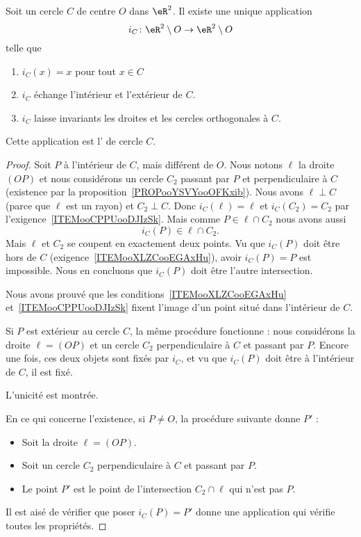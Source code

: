\begin{propositionDef}       \label{PROPDEFooVLIWooQgpLQa}
	Soit un cercle \( C\) de centre \( O\) dans \( \eR^2\). Il existe une unique application
	\begin{equation}
		i_C\colon \eR^2\setminus O\to \eR^2\setminus O
	\end{equation}
	telle que
	\begin{enumerate}
		\item
		      \( i_C(x)=x\) pour tout \( x\in C\)
		\item\label{ITEMooXLZCooEGAxHu}
		      \( i_C\) échange l'intérieur et l'extérieur de \( C\).
		\item\label{ITEMooCPPUooDJIzSk}
		      \( i_C\) laisse invariants les droites et les cercles orthogonales à \( C\).
	\end{enumerate}
	Cette application est l' de cercle \( C\).
\end{propositionDef}

\begin{proof}
	Soit \( P\) à l'intérieur de \( C\), mais différent de \( O\). Nous notons \( \ell\) la droite \( (OP)\) et nous considérons un cercle \( C_2\) passant par \( P\) et perpendiculaire à \( C\) (existence par la proposition~\ref{PROPooYSVYooOFKxib}). Nous avons \( \ell\perp C\) (parce que \( \ell\) est un rayon) et \( C_2\perp C\). Donc \( i_C(\ell)=\ell\) et \( i_C(C_2)=C_2\) par l'exigence~\ref{ITEMooCPPUooDJIzSk}. Mais comme \( P\in\ell\cap C_2 \) nous avons aussi
	\begin{equation}
		i_C(P)\in \ell\cap C_2.
	\end{equation}
	Mais \( \ell\) et \( C_2\) se coupent en exactement deux points. Vu que \( i_C(P)\) doit être hors de \( C\) (exigence~\ref{ITEMooXLZCooEGAxHu}), avoir \( i_C(P)=P\) est impossible. Nous en concluons que \( i_C(P)\) doit être l'autre intersection.

	Nous avons prouvé que les conditions~\ref{ITEMooXLZCooEGAxHu} et~\ref{ITEMooCPPUooDJIzSk} fixent l'image d'un point situé dans l'intérieur de \( C\).

	Si \( P\) est extérieur au cercle \( C\), la même procédure fonctionne : nous considérons la droite \( \ell=(OP)\) et un cercle \( C_2\) perpendiculaire à \( C\) et passant par \( P\). Encore une fois, ces deux objets sont fixés par \( i_C\), et vu que \( i_C(P)\) doit être à l'intérieur de \( C\), il est fixé.

	L'unicité est montrée.

	En ce qui concerne l'existence, si \( P\neq O\), la procédure suivante donne \( P'\) :
	\begin{itemize}
		\item Soit la droite \( \ell=(OP)\).
		\item Soit un cercle \( C_2\) perpendiculaire à \( C\) et passant par \( P\).
		\item Le point \( P'\) est le point de l'intersection \( C_2\cap\ell\) qui n'est pas \( P\).
	\end{itemize}
	Il est aisé de vérifier que poser \( i_C(P)=P'\) donne une application qui vérifie toutes les propriétés.
\end{proof}

